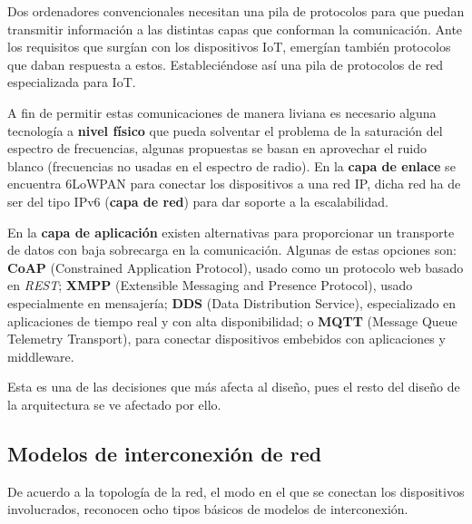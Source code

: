 \documentclass[a4paper,10pt]{article}
\begin{document}
Dos ordenadores convencionales necesitan una pila de protocolos para que
puedan transmitir información a las distintas capas que conforman la
comunicación. Ante los requisitos que surgían con los dispositivos IoT,
emergían también protocolos que daban respuesta a estos. Estableciéndose
así una pila de protocolos de red especializada para IoT.

A fin de permitir estas comunicaciones de manera liviana es necesario
alguna tecnología a \textbf{nivel físico} que pueda solventar el
problema de la saturación del espectro de frecuencias, algunas
propuestas se basan en aprovechar el ruido blanco (frecuencias no
usadas en el espectro de radio)\cite{tempertonTVWhiteSpace2015}.  En
la \textbf{capa de enlace} se encuentra
6LoWPAN\cite{schumacherIPv6LowPowerWireless} para conectar los
dispositivos a una red IP, dicha red ha de ser del tipo IPv6
(\textbf{capa de red}) para dar soporte a la escalabilidad.

En la \textbf{capa de aplicación} existen alternativas para
proporcionar un transporte de datos con baja sobrecarga en la
comunicación. Algunas de estas opciones\cite{al-fuqahaInternetThingsSurvey2015}
son: \textbf{CoAP}
(Constrained Application Protocol), usado como un protocolo web basado
en \textit{REST}\cite{WebServicesArchitecture}; \textbf{XMPP}
(Extensible Messaging and Presence Protocol), usado especialmente en
mensajería; \textbf{DDS} (Data Distribution Service), especializado en
aplicaciones de tiempo real y con alta disponibilidad; o \textbf{MQTT}
(Message Queue Telemetry Transport), para conectar dispositivos
embebidos con aplicaciones y middleware.

Esta es una de las decisiones que más afecta al diseño, pues el resto
del diseño de la arquitectura se ve afectado por ello.

\subsection{Modelos de interconexión de
red}\label{modelos-de-interconexiuxf3n-de-red}

De acuerdo a la topología de la red, el modo en el que se conectan los
dispositivos involucrados, reconocen ocho tipos básicos de modelos de
interconexión.\cite{bicsiNetworkDesignBasics2002}
\end{document}
